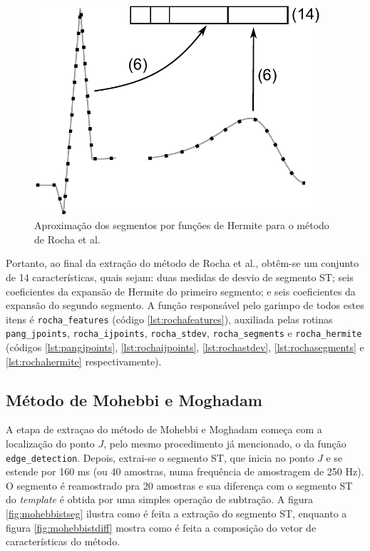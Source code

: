 \begin{figure}[ht]
    \centering
    \includegraphics[width=300pt]{figures/chap6-rocha-hermite.pdf}
    \caption[Aproximação dos segmentos por funções de Hermite]{Aproximação dos segmentos por funções de Hermite para o método de Rocha et al.}
    \label{fig:rochaherm}
\end{figure}

Portanto, ao final da extração do método de Rocha et al., obtêm-se um conjunto de 14 características, quais sejam: duas medidas de desvio de segmento ST; seis coeficientes da expansão de Hermite do primeiro segmento; e seis coeficientes da expansão do segundo segmento. A função responsável pelo garimpo de todos estes itens é \texttt{rocha\_features} (código \ref{lst:rochafeatures}), auxiliada pelas rotinas \texttt{pang\_jpoints}, \texttt{rocha\_ijpoints}, \texttt{rocha\_stdev}, \texttt{rocha\_segments} e \texttt{rocha\_hermite} (códigos \ref{lst:pangjpoints}, \ref{lst:rochaijpoints}, \ref{lst:rochastdev}, \ref{lst:rochasegments} e \ref{lst:rochahermite} respectivamente).

\subsection*{Método de Mohebbi e Moghadam}
A etapa de extraçao do método de Mohebbi e Moghadam começa com a localização do ponto $J$, pelo mesmo procedimento já mencionado, o da função \texttt{edge\_detection}. Depois, extrai-se o segmento ST, que inicia no ponto $J$ e se estende por 160 ms (ou 40 amostras, numa frequência de amostragem de 250 Hz). O segmento é reamostrado pra 20 amostras e sua diferença com o segmento ST do \emph{template} é obtida por uma simples operação de subtração. A figura \ref{fig:mohebbistseg} ilustra como é feita a extração do segmento ST, enquanto a figura \ref{fig:mohebbistdiff} mostra como é feita a composição do vetor de características do método.


